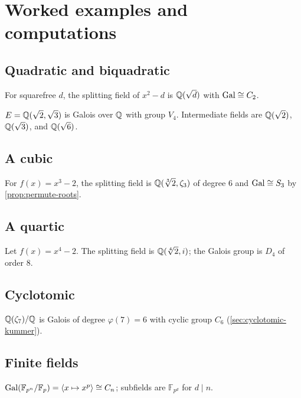 \section{Worked examples and computations}\label{sec:worked-examples}

\subsection{Quadratic and biquadratic}
\begin{example}[Quadratic]
For squarefree $d$, the splitting field of $x^2-d$ is $\mathbb{Q}(\sqrt d)$ with $\operatorname{Gal}\cong C_2$.
\end{example}
\begin{example}[Biquadratic]
$E=\mathbb{Q}(\sqrt2,\sqrt3)$ is Galois over $\mathbb{Q}$ with group $V_4$. Intermediate fields are $\mathbb{Q}(\sqrt2)$, $\mathbb{Q}(\sqrt3)$, and $\mathbb{Q}(\sqrt6)$.
\end{example}

\subsection{A cubic}
\begin{example}
For $f(x)=x^3-2$, the splitting field is $\Q(\root3\of2,\zeta_3)$ of degree $6$ and $\operatorname{Gal}\cong S_3$ by \cref{prop:permute-roots}.
\end{example}

\subsection{A quartic}
\begin{example}
Let $f(x)=x^4-2$. The splitting field is $\mathbb{Q}(\sqrt[4]{2},i)$; the Galois group is $D_4$ of order $8$.
\end{example}

\subsection{Cyclotomic}
\begin{example}
$\mathbb{Q}(\zeta_7)/\mathbb{Q}$ is Galois of degree $\varphi(7)=6$ with cyclic group $C_6$ (\cref{sec:cyclotomic-kummer}).
\end{example}

\subsection{Finite fields}
\begin{example}
$\operatorname{Gal}(\mathbb{F}_{p^n}/\mathbb{F}_p)=\langle x\mapsto x^p\rangle\cong C_n$; subfields are $\mathbb{F}_{p^d}$ for $d\mid n$.
\end{example}
